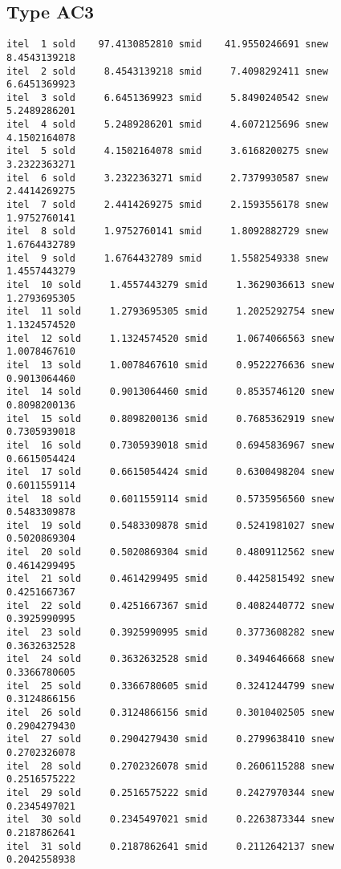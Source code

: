 \documentclass[
  12pt,
  letterpaper,
  DIV=11,
  numbers=noendperiod]{scrartcl}
\begin{document}
\subsection{Type AC3}\label{type-ac3-1}

\begin{verbatim}
itel  1 sold    97.4130852810 smid    41.9550246691 snew     8.4543139218 
itel  2 sold     8.4543139218 smid     7.4098292411 snew     6.6451369923 
itel  3 sold     6.6451369923 smid     5.8490240542 snew     5.2489286201 
itel  4 sold     5.2489286201 smid     4.6072125696 snew     4.1502164078 
itel  5 sold     4.1502164078 smid     3.6168200275 snew     3.2322363271 
itel  6 sold     3.2322363271 smid     2.7379930587 snew     2.4414269275 
itel  7 sold     2.4414269275 smid     2.1593556178 snew     1.9752760141 
itel  8 sold     1.9752760141 smid     1.8092882729 snew     1.6764432789 
itel  9 sold     1.6764432789 smid     1.5582549338 snew     1.4557443279 
itel  10 sold     1.4557443279 smid     1.3629036613 snew     1.2793695305 
itel  11 sold     1.2793695305 smid     1.2025292754 snew     1.1324574520 
itel  12 sold     1.1324574520 smid     1.0674066563 snew     1.0078467610 
itel  13 sold     1.0078467610 smid     0.9522276636 snew     0.9013064460 
itel  14 sold     0.9013064460 smid     0.8535746120 snew     0.8098200136 
itel  15 sold     0.8098200136 smid     0.7685362919 snew     0.7305939018 
itel  16 sold     0.7305939018 smid     0.6945836967 snew     0.6615054424 
itel  17 sold     0.6615054424 smid     0.6300498204 snew     0.6011559114 
itel  18 sold     0.6011559114 smid     0.5735956560 snew     0.5483309878 
itel  19 sold     0.5483309878 smid     0.5241981027 snew     0.5020869304 
itel  20 sold     0.5020869304 smid     0.4809112562 snew     0.4614299495 
itel  21 sold     0.4614299495 smid     0.4425815492 snew     0.4251667367 
itel  22 sold     0.4251667367 smid     0.4082440772 snew     0.3925990995 
itel  23 sold     0.3925990995 smid     0.3773608282 snew     0.3632632528 
itel  24 sold     0.3632632528 smid     0.3494646668 snew     0.3366780605 
itel  25 sold     0.3366780605 smid     0.3241244799 snew     0.3124866156 
itel  26 sold     0.3124866156 smid     0.3010402505 snew     0.2904279430 
itel  27 sold     0.2904279430 smid     0.2799638410 snew     0.2702326078 
itel  28 sold     0.2702326078 smid     0.2606115288 snew     0.2516575222 
itel  29 sold     0.2516575222 smid     0.2427970344 snew     0.2345497021 
itel  30 sold     0.2345497021 smid     0.2263873344 snew     0.2187862641 
itel  31 sold     0.2187862641 smid     0.2112642137 snew     0.2042558938 

\end{verbatim}
\end{document}
